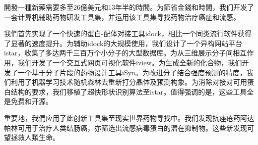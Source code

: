 開發一種新藥需要多至26億美元和13年半的時間。为節省金錢和時間，我们开发了一套计算机辅助药物研发工具集，并运用该工具集寻找药物治疗癌症和流感。

我們首先实现了一个快速的蛋白-配体对接工具idock，相比一个同类流行软件获得了显著的速度提升。为辅助idock的大规模使用，我们设计了一个异构网站平台istar，收集了多达两千三百万个小分子的大型数据库。为从三维展示分子间相互作用，我们开发了一个交互式网页可视化软件iview。为生成全新的化合物，我们开发了一个基于分子片段的药物设计工具iSyn。为改进分子结合强度预测的精度，我们利用了机器学习技术随机森林去重新打分晶体及预测构象。为消除对接对可用蛋白结构的要求，我们移植了超快形状识别算法至istar。值得强调的是，这些工具全是免费和开源。

重要地，我們应用了此创新工具集至现实世界药物寻找中。我们发现抗痤疮药阿达帕林可用于治疗人类结肠癌，亦筛选出流感病毒蛋白的潜在抑制物。这些新发现可望拯救人類生命。
